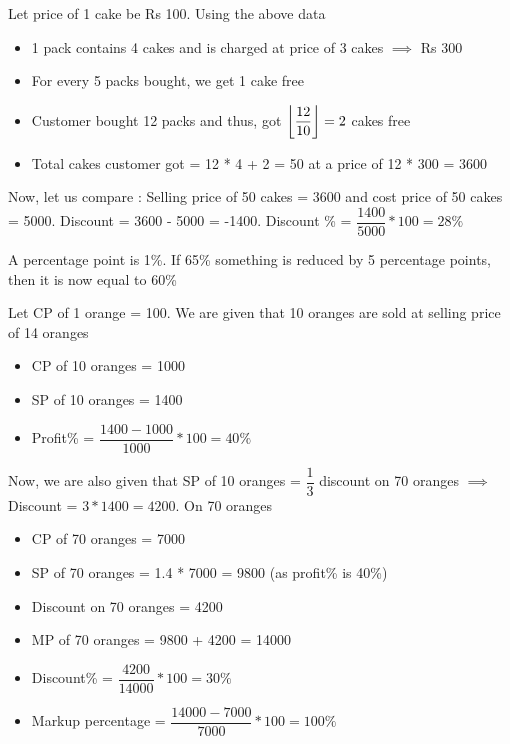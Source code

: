 
Let price of 1 cake be Rs 100. Using the above data
\begin{itemize}
    \item 1 pack contains 4 cakes and is charged at price of 3 cakes $\implies $ Rs 300
    \item For every 5 packs bought, we get 1 cake free 
    \item Customer bought 12 packs and thus, got $\displaystyle{\left \lfloor {\dfrac{12}{10}} \right \rfloor} = 2$ cakes free
    \item Total cakes customer got = 12 * 4 + 2 = 50 at a price of 12 * 300 = 3600
\end{itemize}

Now, let us compare : Selling price of 50 cakes = 3600 and cost price of 50 cakes = 5000. Discount = 3600 - 5000 = -1400. Discount \% = $\dfrac{1400}{5000} * 100 = 28\%$


\begin{NOTE}
    A percentage point is 1\%. If 65\%  something is reduced by 5 percentage points, then it is now equal to 60\%
\end{NOTE}

Let CP of 1 orange = 100. We are given that 10 oranges are sold at selling price of 14 oranges
\begin{itemize}
    \item CP of 10 oranges = 1000
    \item SP of 10 oranges = 1400
    \item Profit\% = $\dfrac{1400 - 1000}{1000} * 100 = 40\%$
\end{itemize}

Now, we are also given that SP of 10 oranges = $\dfrac{1}{3}$ discount on 70 oranges $\implies $ Discount = $3 * 1400 = 4200$. On 70 oranges
\begin{itemize}
    \item CP of 70 oranges = 7000
    \item SP of 70 oranges = 1.4 * 7000 = 9800 (as profit\% is 40\%)
    \item Discount on 70 oranges = 4200
    \item MP of 70 oranges = 9800 + 4200 = 14000
    \item Discount\% = $\dfrac{4200}{14000} * 100 = 30\%$
    \item Markup percentage = $\dfrac{14000 - 7000}{7000} * 100 = 100\%$
\end{itemize}

